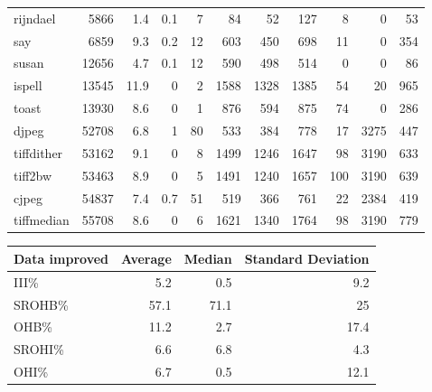 \begin{tabular}{lrrrrrrrrrr}
 rijndael        &           5866 &      1.4 &    0.1 &    7 &     84 &         52 &          127 &     8 &     0 &    53 \\
 say             &           6859 &      9.3 &    0.2 &   12 &    603 &        450 &          698 &    11 &     0 &   354 \\
 susan           &          12656 &      4.7 &    0.1 &   12 &    590 &        498 &          514 &     0 &     0 &    86 \\
 ispell          &          13545 &     11.9 &    0   &    2 &   1588 &       1328 &         1385 &    54 &    20 &   965 \\
 toast           &          13930 &      8.6 &    0   &    1 &    876 &        594 &          875 &    74 &     0 &   286 \\
 djpeg           &          52708 &      6.8 &    1   &   80 &    533 &        384 &          778 &    17 &  3275 &   447 \\
 tiffdither      &          53162 &      9.1 &    0   &    8 &   1499 &       1246 &         1647 &    98 &  3190 &   633 \\
 tiff2bw         &          53463 &      8.9 &    0   &    5 &   1491 &       1240 &         1657 &   100 &  3190 &   639 \\
 cjpeg           &          54837 &      7.4 &    0.7 &   51 &    519 &        366 &          761 &    22 &  2384 &   419 \\
 tiffmedian      &          55708 &      8.6 &    0   &    6 &   1621 &       1340 &         1764 &    98 &  3190 &   779 \\
\hline
\end{tabular}\begin{tabular}{lrrr}
\hline
 Data improved   &   Average &   Median &   Standard Deviation \\
\hline
 III\%            &       5.2 &      0.5 &                  9.2 \\
 SROHB\%          &      57.1 &     71.1 &                 25   \\
 OHB\%            &      11.2 &      2.7 &                 17.4 \\
 SROHI\%          &       6.6 &      6.8 &                  4.3 \\
 OHI\%            &       6.7 &      0.5 &                 12.1 \\
\hline
\end{tabular}